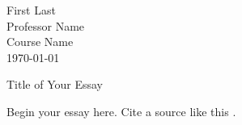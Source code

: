 \documentclass[12pt,letterpaper]{article}
\begin{document}
\begin{flushleft}
First Last \\
Professor Name \\
Course Name \\
\today
\end{flushleft}

\begin{center}
Title of Your Essay
\end{center}

Begin your essay here. Cite a source like this \autocite{sample}.

\printbibliography[title={Works Cited}]
\end{document}

